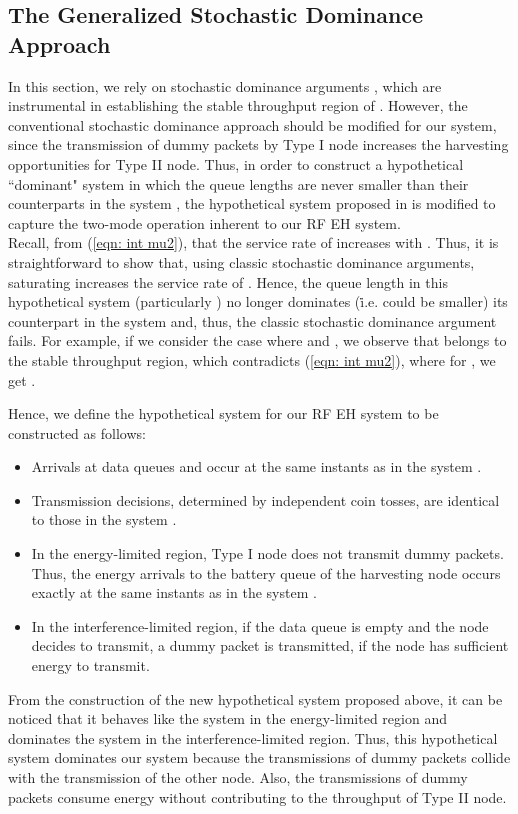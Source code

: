 \documentclass[draftcls,12pt,onecolumn]{IEEEtran}
\begin{document}
\subsection{The Generalized Stochastic Dominance Approach}
In this section, we rely on stochastic dominance arguments \cite{rao1988stability}, which are instrumental in establishing the stable throughput region of . However, the conventional stochastic dominance approach should be modified for our system, since the transmission of dummy packets by Type I node increases the harvesting opportunities for Type II node. Thus, in order to construct a hypothetical ``dominant" system in which the queue lengths are never smaller than their counterparts in the system , the hypothetical system proposed in \cite{rao1988stability} is modified to capture the two-mode operation inherent to our RF EH system.\\ 
Recall, from (\ref{eqn: int mu2}), that the service rate of  increases with . Thus, it is straightforward to show that, using classic stochastic dominance arguments, saturating  increases the service rate of . Hence, the queue length in this hypothetical system (particularly ) no longer dominates (\.i.e. could be smaller) its counterpart in the system  and, thus, the classic stochastic dominance argument fails. For example, if we consider the case where  and , we observe that  belongs to the stable throughput region, which contradicts (\ref{eqn: int mu2}), where for , we get .

Hence, we define the hypothetical system for our RF EH system to be constructed as follows: 
\begin{itemize}
\item Arrivals at data queues  and  occur at the same instants as in the system .
\item Transmission decisions, determined by independent coin tosses, are identical to those in the system .
\item In the energy-limited region, Type I node does not transmit dummy packets. Thus, the energy arrivals to the battery queue of the harvesting node occurs exactly at the same instants as in the system .
\item In the interference-limited region, if the data queue is empty and the node decides to transmit, a dummy packet is transmitted, if the node has sufficient energy to transmit.  
\end{itemize}

\indent From the construction of the new hypothetical system proposed above, it can be noticed that it behaves like the system  in the energy-limited region and dominates the system  in the interference-limited region. Thus, this hypothetical system dominates our system  because the transmissions of dummy packets collide with the transmission of the other node. Also, the transmissions of dummy packets consume energy without contributing to the throughput of Type II node.
\vspace{-0.15in}
\end{document}
